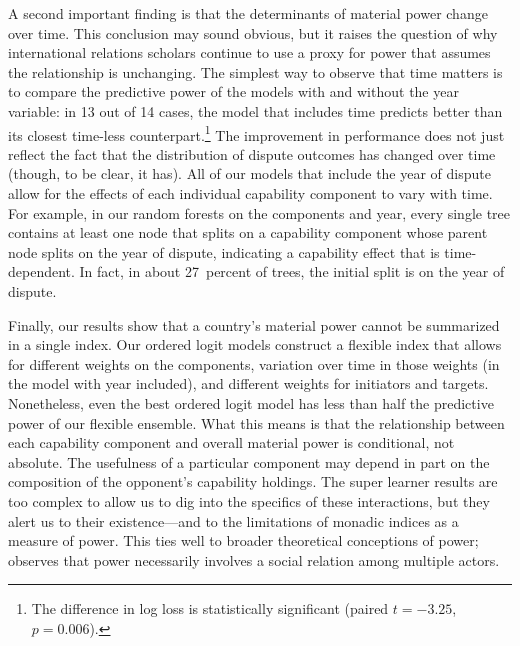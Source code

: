A second important finding is that the determinants of material power change over time.
This conclusion may sound obvious, but it raises the question of why international relations scholars continue to use a proxy for power that assumes the relationship is unchanging.
The simplest way to observe that time matters is to compare the predictive power of the models with and without the year variable: in 13 out of 14 cases, the model that includes time predicts better than its closest time-less counterpart.\footnote{%
  The difference in log loss is statistically significant (paired $t = -3.25$, $p = 0.006$).
}
The improvement in performance does not just reflect the fact that the distribution of dispute outcomes has changed over time (though, to be clear, it has).
All of our models that include the year of dispute allow for the effects of each individual capability component to vary with time.
For example, in our random forests on the components and year, every single tree contains at least one node that splits on a capability component whose parent node splits on the year of dispute, indicating a capability effect that is time-dependent.
In fact, in about 27~percent of trees, the initial split is on the year of dispute.

Finally, our results show that a country's material power cannot be summarized in a single index.
Our ordered logit models construct a flexible index that allows for different weights on the components, variation over time in those weights (in the model with year included), and different weights for initiators and targets.
Nonetheless, even the best ordered logit model has less than half the predictive power of our flexible ensemble.
What this means is that the relationship between each capability component and overall material power is conditional, not absolute.
The usefulness of a particular component may depend in part on the composition of the opponent's capability holdings.
The super learner results are too complex to allow us to dig into the specifics of these interactions, but they alert us to their existence---and to the limitations of monadic indices as a measure of power.
This ties well to broader theoretical conceptions of power; \citet[48]{Dowding1991} observes that power necessarily involves a social relation among multiple actors.


